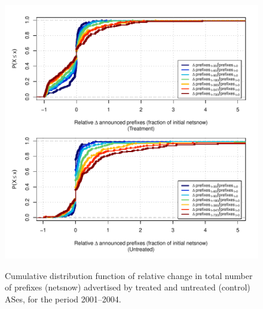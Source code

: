 \begin{figure}[H]
\begin{centering}
\begin{singlespace}
    \includegraphics[width=6in]{figures/behavior-rel_netsnow-2001_2004-corr.pdf}
    \vspace{-2em}\\
    \caption{Cumulative distribution function of relative change in total
    number of prefixes (netsnow) advertised by treated and untreated (control)
    ASes, for the period 2001--2004.}
\end{singlespace}
\end{centering}
\end{figure}
